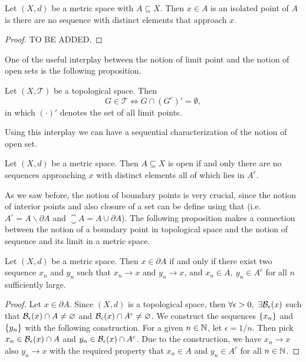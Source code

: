 \begin{proposition}
	Let $(X,d)$ be a metric space with $A \subseteq X$. Then $x \in A$ is an isolated point of $A$ is there are no sequence with distinct elements that approach $x$.
\end{proposition} 

\begin{proof}
	TO BE ADDED.
\end{proof}

One of the useful interplay between the notion of limit point and the notion of open sets is the following proposition.

\begin{proposition}
	Let $(X,\mathcal{T})$ be a topological space. Then
	\[ G \in \mathcal{T} \Longleftrightarrow G \cap (G^c)' = \emptyset, \]
	in which $(\cdot)'$ denotes the set of all limit points.
\end{proposition}

Using this interplay we can have a sequential characterization of the notion of open set.

\begin{proposition}
	Let $(X,d)$ be a metric space. Then $A \subseteq X$ is open if and only there are no sequences approaching $x$ with distinct elements all of which lies in $A^c$.
\end{proposition}

As we saw before, the notion of boundary points is very crucial, since the notion of interior points and also closure of a set can be define using that (i.e. $A^\circ = A \backslash \partial A$ and $\closure{A}= A \cup \partial A$). The following proposition makes a connection between the notion of a boundary point in topological space and the notion of sequence and its limit in a metric space.

\begin{proposition}
	Let $(X,d)$ be a metric space. Then $x \in \partial A$ if and only if there exist two sequence $x_n$ and $y_n$ such that $x_n \to x$ and $y_n \to x$, and $x_n \in A,\ y_n \in A^c$ for all $n$ sufficiently large. 
\end{proposition}

\begin{proof}
	Let $x \in \partial A$. Since $(X,d)$ is a topological space, then $\forall \epsilon > 0,\ \exists \mathcal{B}_{\epsilon}(x)$ such that $\mathcal{B}_{\epsilon}(x) \cap A \neq \varnothing$ and $\mathcal{B}_{\epsilon}(x) \cap A^c \neq \varnothing$. We construct the sequences $\{x_n\}$ and $\{y_n\}$ with the following construction. For a given $n \in \mathbb{N}$, let $\epsilon=1/n$. Then pick $x_n \in \mathcal{B}_{\epsilon}(x) \cap A$ and $y_n \in \mathcal{B}_{\epsilon}(x) \cap A^c$. Due to the construction, we have $x_n\to x$ also $y_n \to x$ with the required property that $x_n \in A$ and $y_n \in A^c$ for all $n \in \mathbb{N}$.
\end{proof}


